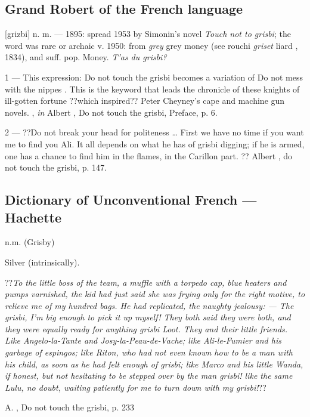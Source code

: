 \subsection*{Grand Robert of the French language}

[grizbi] n. m. --- 1895: spread 1953 by Simonin's novel \emph{Touch not to grisbi}; the word was rare or archaic v. 1950: from \emph{grey} \og grey money \fg{} (see rouchi \emph{griset} \og liard \fg{}, 1834), and suff. pop.
 Money. \emph{T'as du grisbi?}

1 --- This expression: \og Do not touch the grisbi \fg{} becomes a variation of \og Do not mess with the nippes \fg{}. This is the keyword that leads the chronicle of these knights of ill-gotten fortune ??which inspired??  Peter Cheyney's cape and machine gun novels.
, \emph{in} Albert , Do not touch the grisbi, Preface, p. 6.

2 --- ??\og Do not break your head for politeness \ldots{} First we have no time if you want me to find you Ali. It all depends on what he has of grisbi digging; if he is armed, one has a chance to find him in the flames, in the Carillon part. \fg{}??
Albert , do not touch the grisbi, p. 147.

\subsection*{Dictionary of Unconventional French --- Hachette}

n.m. (Grisby)

Silver (intrinsically).

??\emph{To the little boss of the team, a muffle with a torpedo cap, blue
heaters and pumps varnished, the kid had just said she was frying
only for the right motive, to relieve me of my hundred bags. He had
replicated, the naughty jealousy:
--- The \emph{grisbi}, I'm big enough to pick it up myself!
They both said they were both, and they were equally ready for anything
\emph{grisbi} Loot. They and their little friends. Like Angelo-la-Tante and
Josy-la-Peau-de-Vache; like Ali-le-Fumier and his garbage of espingos;
like Riton, who had not even known how to be a man with his child, as soon as he
had felt enough of \emph{grisbi}; like Marco and his little Wanda, if
honest, but not hesitating to be stepped over by the man \emph{grisbi}! like the same Lulu, no doubt, waiting patiently for me to turn down with my \emph{grisbi}!}??

A. , Do not touch the grisbi, p. 233

